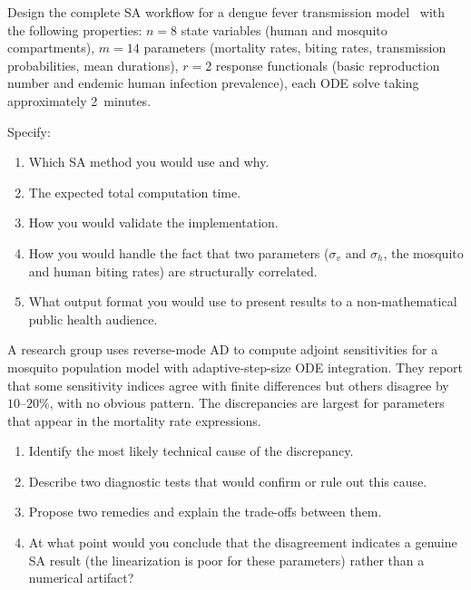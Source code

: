 \begin{exercise}[\bloom{L5}]
\label{ex:ch7:workflow}
Design the complete SA workflow for a dengue fever transmission
model~\cite{chitnis2008determining} with the following properties:
$n = 8$ state variables (human and mosquito compartments),
$m = 14$ parameters (mortality rates, biting rates, transmission
probabilities, mean durations), $r = 2$ response functionals
(basic reproduction number and endemic human infection prevalence),
each ODE solve taking approximately 2~minutes.

Specify:
\begin{enumerate}[label=(\alph*)]
  \item Which SA method you would use and why.
  \item The expected total computation time.
  \item How you would validate the implementation.
  \item How you would handle the fact that two parameters
        ($\sigma_v$ and $\sigma_h$, the mosquito and human biting rates)
        are structurally correlated.
  \item What output format you would use to present results to
        a non-mathematical public health audience.
\end{enumerate}
\end{exercise}

\begin{exercise}[\bloom{L6}]
\label{ex:ch7:disagree}
A research group uses reverse-mode AD to compute adjoint sensitivities
for a mosquito population model with adaptive-step-size ODE integration.
They report that some sensitivity indices agree with finite differences
but others disagree by $10$--$20\%$, with no obvious pattern.
The discrepancies are largest for parameters that appear in the
mortality rate expressions.
\begin{enumerate}[label=(\alph*)]
  \item Identify the most likely technical cause of the discrepancy.
  \item Describe two diagnostic tests that would confirm or rule out
        this cause.
  \item Propose two remedies and explain the trade-offs between them.
  \item At what point would you conclude that the disagreement indicates
        a genuine SA result (the linearization is poor for these parameters)
        rather than a numerical artifact?
\end{enumerate}
\end{exercise}


